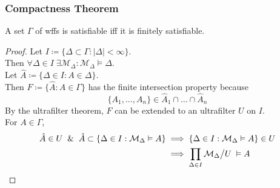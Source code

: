 \documentclass[UTF8,11pt,colorlinks,compress,openany]{beamer}%
\begin{document}
\begin{frame}\frametitle{Compactness Theorem}
\setlength\abovedisplayskip{0pt}
\setlength\belowdisplayskip{0pt}
	\begin{corollary}
		A set $\Gamma$ of wffs is satisfiable iff it is finitely satisfiable.
	\end{corollary}
	\begin{proof}
		Let $I\coloneqq \big\{\Delta\subset\Gamma: |\Delta|<\infty\big\}$.\\
		Then $\forall \Delta\in I\;\exists \mathcal{M}_\Delta: \mathcal{M}_\Delta\vDash\Delta$.\\
		Let $\hat{A}\coloneqq \{\Delta\in I: A\in\Delta\}$.\\
		Then $F\coloneqq \{\hat{A}: A\in\Gamma\}$ has the finite intersection property because
		\[\{A_1,\dots, A_n\}\in\hat{A}_1\cap\dots\cap\hat{A}_n\]
		By the ultrafilter theorem, $F$ can be extended to an ultrafilter $U$ on $I$.\\
		For $A\in\Gamma$,
		\begin{align*}
		\hat{A}\in U\;\;\&\;\;\hat{A}\subset\{\Delta\in I:\mathcal{M}_\Delta\vDash A\}&\implies\{\Delta\in I:\mathcal{M}_\Delta\vDash A\}\in U\\
		&\implies\prod\limits_{\Delta\in I}\mathcal{M}_\Delta\big\slash U\;\vDash A
		\end{align*}
	\end{proof}
\end{frame}
\end{document}
